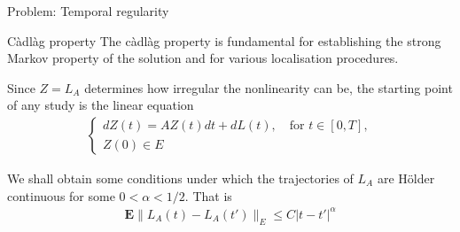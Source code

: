 \documentclass[xcolor=dvipsnames,leqno]{beamer}
\begin{document}
\begin{frame}{Problem: Temporal regularity}
\begin{block}{C\`adl\`ag property}
	The  c\`adl\`ag property is fundamental for establishing the strong Markov property of the solution and for various localisation procedures.
\end{block}
Since $Z=L_A$ determines how irregular the nonlinearity can be, the starting point of any study is the linear equation
	\begin{align*}
	\begin{cases}
		dZ(t)=AZ(t)dt+dL(t),\quad\text{for}\,\,t\in[0,T],\\
		Z(0)\in E
	\end{cases}
	\end{align*} 

\vspace{1cm}
{\color{purple}We shall obtain some conditions under which the trajectories of $L_A$ are H\"{o}lder continuous for some $0<\alpha<1/2$. That is 
\begin{align*}
	\mathbf{E}\|L_A(t)-L_A(t')\|_{E}\leq C|t-t'|^{\alpha}
\end{align*}}
\end{frame}    
\end{document}
